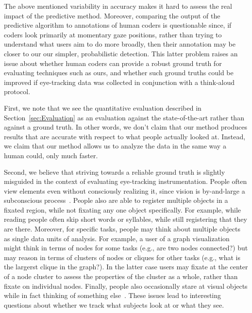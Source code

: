 The above mentioned variability in accuracy makes it hard to assess the real impact of the predictive method. Moreover, comparing the output of the predictive algorithm to annotations of human coders is questionable since, if coders look primarily at momentary gaze positions, rather than trying to understand what users aim to do more broadly, then their annotation may be closer to our our simpler, probabilistic detection.  This latter problem raises an issue about whether human coders can provide a robust ground truth for evaluating techniques such as ours, and whether such ground truths could be improved if eye-tracking data was collected in conjunction with a think-aloud protocol.  

First, we note that we see the quantitative evaluation described in Section~\ref{sec:Evaluation} as an evaluation against the state-of-the-art rather than against a ground truth. In other words, we don't claim that our method produces results that are accurate with respect to what people actually looked at. Instead, we claim that our method allows us to analyze the data in the same way a human could, only much faster. 

Second, we believe that striving towards a reliable ground truth is slightly misguided in the context of evaluating eye-tracking instrumentation.  People often view elements even without consciously realizing it, since vision is by-and-large a subconscious process~\cite{duchowski2007eye}. People also are able to register multiple objects in a fixated region, while not fixating any one object specifically. For example, while reading people often skip short words or syllables, while still registering that they are there. Moreover, for specific tasks, people may think about multiple objects as single data units of analysis. For example, a user of a graph visualization might think in terms of nodes for some tasks (e.g., are two nodes connected?) but may reason in terms of clusters of nodes or cliques for other tasks (e.g., what is the largerst clique in the graph?). In the latter case users may fixate at the center of a node cluster to assess the properties of the cluster as a whole, rather than fixate on individual nodes. Finally, people also occasionally stare at visual objects while in fact thinking of something else~\cite{duchowski2007eye}. These issues lead to interesting questions about whether we track what subjects look at or what they see.  


